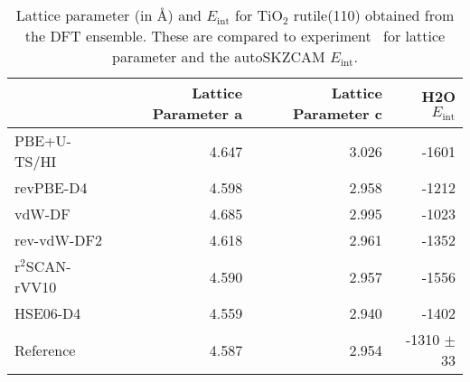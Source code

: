 \begin{table}
\caption{\label{tab:lattice_parametersr-tio2}Lattice parameter (in \AA{}) and  $E_\textrm{int}$ for TiO$_2$ rutile(110) obtained from the DFT ensemble. These are compared to experiment~\cite{burdettStructuralelectronicRelationshipsInorganic1987} for lattice parameter and the autoSKZCAM $E_\textrm{int}$.}
\begin{tabular}{lrrr}
\toprule
 & Lattice Parameter a & Lattice Parameter c & H2O $E_\textrm{int}$ \\ 
\midrule
PBE+U-TS/HI & 4.647 & 3.026 & -1601 \\
revPBE-D4 & 4.598 & 2.958 & -1212 \\
vdW-DF & 4.685 & 2.995 & -1023 \\
rev-vdW-DF2 & 4.618 & 2.961 & -1352 \\
r$^2$SCAN-rVV10 & 4.590 & 2.957 & -1556 \\
HSE06-D4 & 4.559 & 2.940 & -1402 \\
Reference & 4.587 & 2.954 & -1310 $\pm$ 33 \\
\bottomrule
\end{tabular}
\end{table}